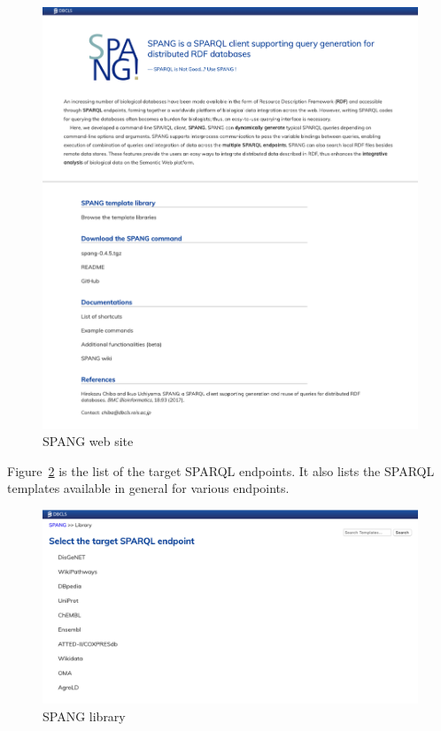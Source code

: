\documentclass[runningheads]{llncs}
\begin{document}
\begin{figure}
\center
\includegraphics[width=1.0\textwidth]{spang_top.png}
\caption{SPANG web site}
\label{fig:spang_top}
\end{figure}

Figure~\ref{fig:spang_lib} is the list of the target SPARQL endpoints. It also lists the SPARQL templates available in general for various endpoints.

\begin{figure}
\center
\includegraphics[width=1.0\textwidth]{spang_lib.png}
\caption{SPANG library}
\label{fig:spang_lib}
\end{figure}
\end{document}
